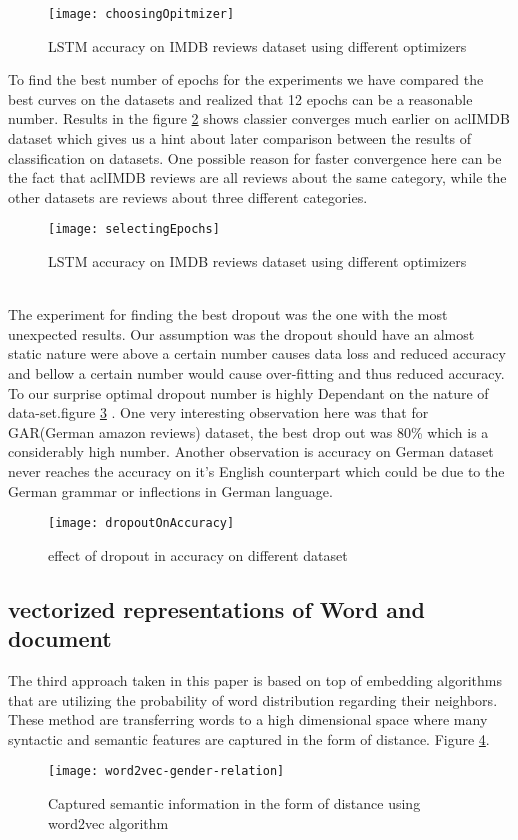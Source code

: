 	\begin{figure}
		\centering
		\texttt{[image: choosingOpitmizer]}
		\caption{LSTM accuracy on IMDB reviews dataset using different optimizers}
		\label{fig:choosingOpitmizer}
	\end{figure}
	To find the best number of epochs for the experiments we have compared the best curves on the datasets and realized that 12 epochs can be a reasonable number. Results in the  figure \ref{fig:selectingEpochs} shows classier converges much earlier on aclIMDB dataset which gives us a hint about later comparison between the results of classification on datasets. One possible reason for faster convergence here can be the fact that aclIMDB reviews are all reviews about the same category, while the other datasets are reviews about three different categories.
		\begin{figure}
			\centering
			\texttt{[image: selectingEpochs]}
			\caption{LSTM accuracy on IMDB reviews dataset using different optimizers}
			\label{fig:selectingEpochs}
		\end{figure}\\
	The experiment for finding the best dropout was the one with the most unexpected results. Our assumption was the dropout should have an almost static nature were above a certain number causes data loss and reduced accuracy and bellow a certain number would cause over-fitting and thus reduced accuracy. To our surprise optimal dropout number is highly Dependant on the nature of data-set.figure \ref{fig:dropoutOnAccuracy} .
	One very interesting observation here was that for GAR(German amazon reviews) dataset, the best drop out was 80\% which is a considerably high number. Another observation is accuracy on German dataset never reaches the accuracy on it's English counterpart which could be due to the German grammar or inflections in German language.
		\begin{figure}
			\centering
			\texttt{[image: dropoutOnAccuracy]}
			\caption{effect of dropout in accuracy on different dataset}
			\label{fig:dropoutOnAccuracy}
		\end{figure}
	\subsection*{vectorized representations of Word and document} 
	The third approach taken in this paper is based on top of embedding algorithms that are utilizing the probability of word distribution regarding their neighbors. These method are transferring words to a high dimensional space where many syntactic and semantic features are captured in the form of distance\cite{explainW2V}. Figure \ref{fig:word2vec-gender-relation}.
	\begin{figure}
		\centering
		\texttt{[image: word2vec-gender-relation]}
		\caption{Captured semantic information in the form of distance using word2vec algorithm}
		\label{fig:word2vec-gender-relation}
	\end{figure}
	
